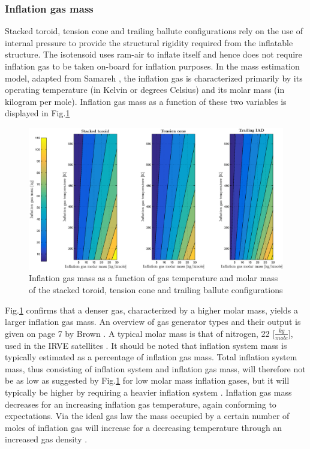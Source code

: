 \subsubsection{Inflation gas mass}
Stacked toroid, tension cone and trailing ballute configurations rely on the use of internal pressure to provide the structural rigidity required from the inflatable structure. The isotensoid uses ram-air to inflate itself and hence does not require inflation gas to be taken on-board for inflation purposes. In the mass estimation model, adapted from Samareh \cite{Samareh2011}, the inflation gas is characterized primarily by its operating temperature (in Kelvin or degrees Celsius) and its molar mass (in kilogram per mole). Inflation gas mass as a function of these two variables is displayed in Fig.\ref{fig:inflmass}

\begin{figure}[H]
\hspace{-5mm}
\includegraphics[width = 1.0\textwidth]{Figure/gas_temp_mass.eps}
\caption{Inflation gas mass as a function of gas temperature and molar mass of the stacked toroid, tension cone and trailing ballute configurations}
\label{fig:inflmass}
\end{figure}

Fig.\ref{fig:inflmass} confirms that a denser gas, characterized by a higher molar mass, yields a larger inflation gas mass. An overview of gas generator types and their output is given on page 7 by Brown \cite{Brown2003}. A typical molar mass is that of nitrogen, 22 [$\frac{kg}{mole}$], used in the IRVE satellites \cite{Dillman2012}. It should be noted that inflation system mass is typically estimated as a percentage of inflation gas mass. Total inflation system mass, thus consisting of inflation system and inflation gas mass, will therefore not be as low as suggested by Fig.\ref{fig:inflmass} for low molar mass inflation gases, but it will typically be higher by requiring a heavier inflation system \cite{Brown2003}. Inflation gas mass decreases for an increasing inflation gas temperature, again conforming to expectations. Via the ideal gas law the mass occupied by a certain number of moles of inflation gas will increase for a decreasing temperature through an increased gas density \cite{AndersonJr.2007}.

